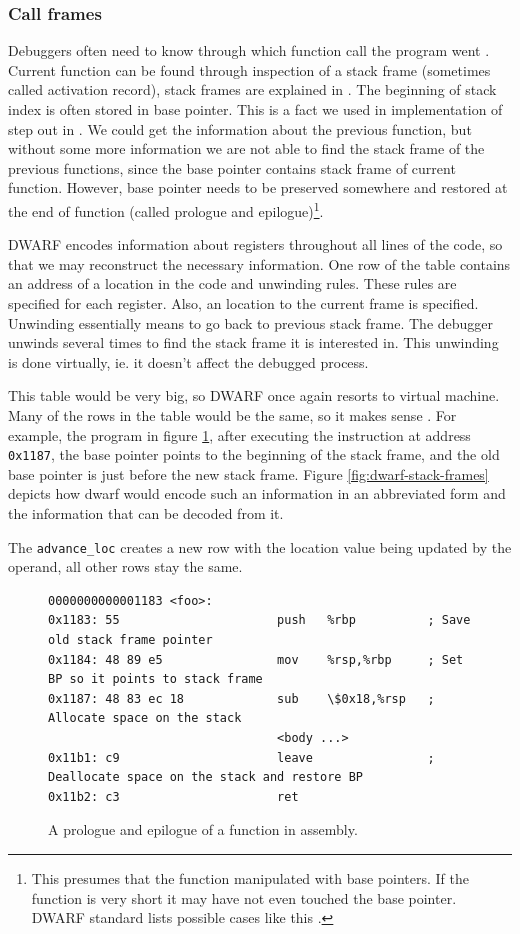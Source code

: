\subsubsection{Call frames}
Debuggers often need to know through which function call the program went
\cite{dwarf}. Current function can be found through inspection of a stack frame
(sometimes called activation record), stack frames are explained in
\cite{dragon-book}. The beginning of stack index is often stored in base
pointer. This is a fact we used in implementation of step out in . We
could get the information about the previous function, but without some more
information we are not able to find the stack frame of the previous functions,
since the base pointer contains stack frame of current function. However, base
pointer needs to be preserved somewhere and restored at the end of function
(called prologue and epilogue)\footnote{This presumes that the function
manipulated with base pointers. If the function is very short it may have not
even touched the base pointer. DWARF standard lists possible cases like this
\cite{dwarf}.}. 

DWARF encodes information about registers throughout all lines of the code, so
that we may reconstruct the necessary information. One row of the table
contains an address of a location in the code and unwinding rules. These rules
are specified for each register. Also, an location to the current frame is
specified. Unwinding essentially means to go back to previous stack frame. The
debugger unwinds several times to find the stack frame it is interested in.
This unwinding is done virtually, ie. it doesn't affect the debugged process.

This table would be very big, so DWARF once again resorts to virtual machine.
Many of the rows in the table would be the same, so it makes sense
\cite{dwarf}. For example, the program in figure
\ref{fig:prologue-and-epilogue}, after executing the instruction at address
\texttt{0x1187}, the base pointer points to the beginning of the stack frame,
and the old base pointer is just before the new stack frame. Figure
\ref{fig:dwarf-stack-frames} depicts how dwarf would encode such an information
in an abbreviated form and the information that can be decoded from it.

The \texttt{advance\_loc} creates a new row with the location value being
updated by the operand, all other rows stay the same.


\begin{figure}
    \begin{lstlisting}
0000000000001183 <foo>:
0x1183:	55                   	push   %rbp          ; Save old stack frame pointer
0x1184:	48 89 e5             	mov    %rsp,%rbp     ; Set BP so it points to stack frame
0x1187:	48 83 ec 18          	sub    \$0x18,%rsp   ; Allocate space on the stack
                                <body ...>
0x11b1:	c9                   	leave                ; Deallocate space on the stack and restore BP
0x11b2:	c3                   	ret
    \end{lstlisting}
    \caption{A prologue and epilogue of a function in assembly.}
    \label{fig:prologue-and-epilogue}
\end{figure}

